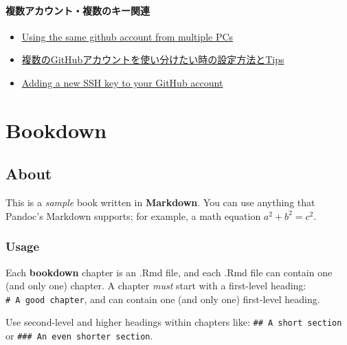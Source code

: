 \documentclass[
  xelatex, ja=standard]{bxjsbook}
\providecommand{\tightlist}{%
  \setlength{\itemsep}{0pt}\setlength{\parskip}{0pt}}
\theoremstyle{definition}
\theoremstyle{definition}
\theoremstyle{definition}
\theoremstyle{definition}
\theoremstyle{remark}
\begin{document}
\hypertarget{ux8907ux6570ux30a2ux30abux30a6ux30f3ux30c8ux8907ux6570ux306eux30adux30fcux95a2ux9023}{%
\subsubsection{複数アカウント・複数のキー関連}\label{ux8907ux6570ux30a2ux30abux30a6ux30f3ux30c8ux8907ux6570ux306eux30adux30fcux95a2ux9023}}

\begin{itemize}
\tightlist
\item
  \href{https://serverfault.com/questions/206907/using-the-same-github-account-from-multiple-pcs}{Using the same github account from multiple PCs}
\item
  \href{https://zenn.dev/taichifukumoto/articles/how-to-use-multiple-github-accounts}{複数のGitHubアカウントを使い分けたい時の設定方法とTips}
\item
  \href{https://docs.github.com/en/authentication/connecting-to-github-with-ssh/adding-a-new-ssh-key-to-your-github-account}{Adding a new SSH key to your GitHub account}
\end{itemize}

\hypertarget{bookdown-original}{%
\chapter{Bookdown}\label{bookdown-original}}

\hypertarget{about}{%
\section{About}\label{about}}

This is a \emph{sample} book written in \textbf{Markdown}. You can use anything that Pandoc's Markdown supports; for example, a math equation \(a^2 + b^2 = c^2\).

\hypertarget{usage-1}{%
\subsection{Usage}\label{usage-1}}

Each \textbf{bookdown} chapter is an .Rmd file, and each .Rmd file can contain one (and only one) chapter. A chapter \emph{must} start with a first-level heading: \texttt{\#\ A\ good\ chapter}, and can contain one (and only one) first-level heading.

Use second-level and higher headings within chapters like: \texttt{\#\#\ A\ short\ section} or \texttt{\#\#\#\ An\ even\ shorter\ section}.
\end{document}
